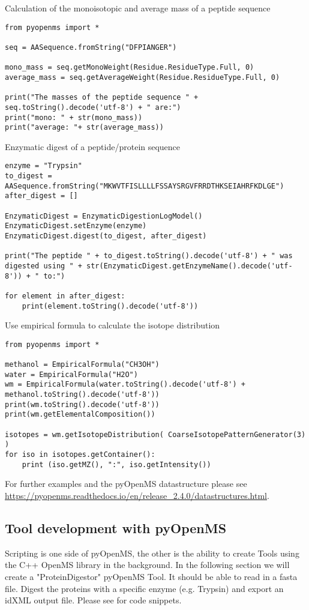 {\noindent Calculation of the monoisotopic and average mass of a peptide sequence 
\begin{lstlisting}
from pyopenms import *

seq = AASequence.fromString("DFPIANGER")

mono_mass = seq.getMonoWeight(Residue.ResidueType.Full, 0)
average_mass = seq.getAverageWeight(Residue.ResidueType.Full, 0)

print("The masses of the peptide sequence " + seq.toString().decode('utf-8') + " are:")
print("mono: " + str(mono_mass))
print("average: "+ str(average_mass))
\end{lstlisting}

\noindent Enzymatic digest of a peptide/protein sequence 
\begin{lstlisting}
enzyme = "Trypsin"
to_digest = AASequence.fromString("MKWVTFISLLLLFSSAYSRGVFRRDTHKSEIAHRFKDLGE")
after_digest = []

EnzymaticDigest = EnzymaticDigestionLogModel()
EnzymaticDigest.setEnzyme(enzyme)
EnzymaticDigest.digest(to_digest, after_digest)

print("The peptide " + to_digest.toString().decode('utf-8') + " was digested using " + str(EnzymaticDigest.getEnzymeName().decode('utf-8')) + " to:")

for element in after_digest:
    print(element.toString().decode('utf-8'))
\end{lstlisting}

\noindent Use empirical formula to calculate the isotope distribution 
\begin{lstlisting}
from pyopenms import *

methanol = EmpiricalFormula("CH3OH")
water = EmpiricalFormula("H2O")
wm = EmpiricalFormula(water.toString().decode('utf-8') + methanol.toString().decode('utf-8'))
print(wm.toString().decode('utf-8'))
print(wm.getElementalComposition())

isotopes = wm.getIsotopeDistribution( CoarseIsotopePatternGenerator(3) )
for iso in isotopes.getContainer():
    print (iso.getMZ(), ":", iso.getIntensity())
\end{lstlisting}

\noindent For further examples and the pyOpenMS datastructure please see \url{https://pyopenms.readthedocs.io/en/release_2.4.0/datastructures.html}. 

\subsection{Tool development with pyOpenMS}
Scripting is one side of pyOpenMS, the other is the ability to create Tools using the C++ OpenMS library in the background.  In the following section we will create a "ProteinDigestor" pyOpenMS Tool. It should be able to read in a fasta file. Digest the proteins with a specific enzyme (e.g. Trypsin) and export an idXML output file. Please see   for code snippets.

}
